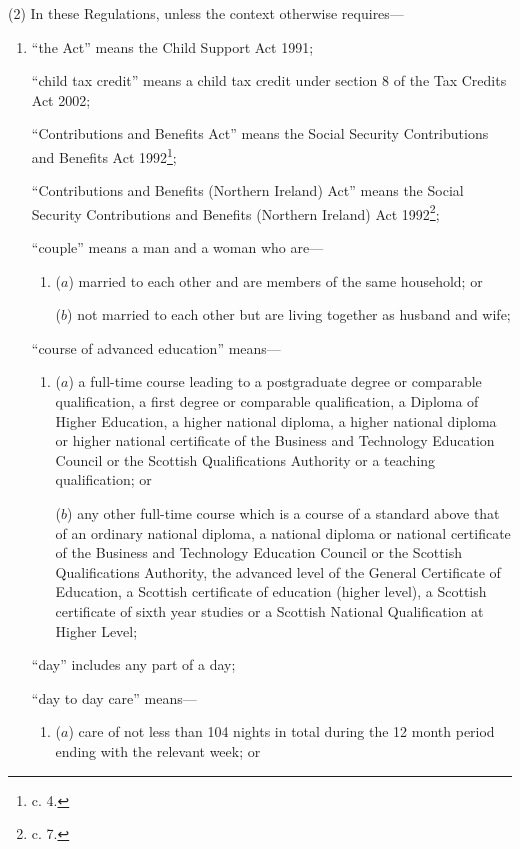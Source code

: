 \documentclass[12pt,a4paper]{article}
\begin{document}
(2) In these Regulations, unless the context otherwise requires—
\begin{enumerate}\item[]
“the Act” means the Child Support Act 1991;

“child tax credit” means a child tax credit under section 8 of the Tax Credits Act 2002;

“Contributions and Benefits Act” means the Social Security Contributions and Benefits Act 1992\footnote{ c. 4.};

“Contributions and Benefits (Northern Ireland) Act” means the Social Security Contributions and Benefits (Northern Ireland) Act 1992\footnote{ c. 7.};

“couple” means a man and a woman who are—
\begin{enumerate}\item[]
($a$) 
married to each other and are members of the same household; or

($b$) 
not married to each other but are living together as husband and wife;
\end{enumerate}

“course of advanced education” means—
\begin{enumerate}\item[]
($a$) 
a full-time course leading to a postgraduate degree or comparable qualification, a first degree or comparable qualification, a Diploma of Higher Education, a higher national diploma, a higher national diploma or higher national certificate of the Business and Technology Education Council or the Scottish Qualifications Authority or a teaching qualification; or

($b$) 
any other full-time course which is a course of a standard above that of an ordinary national diploma, a national diploma or national certificate of the Business and Technology Education Council or the Scottish Qualifications Authority, the advanced level of the General Certificate of Education, a Scottish certificate of education (higher level), a Scottish certificate of sixth year studies or a Scottish National Qualification at Higher Level;
\end{enumerate}

“day” includes any part of a day;

“day to day care” means—
\begin{enumerate}\item[]
($a$) 
care of not less than 104 nights in total during the 12 month period ending with the relevant week; or


\end{enumerate}
\end{enumerate}
\end{document}
